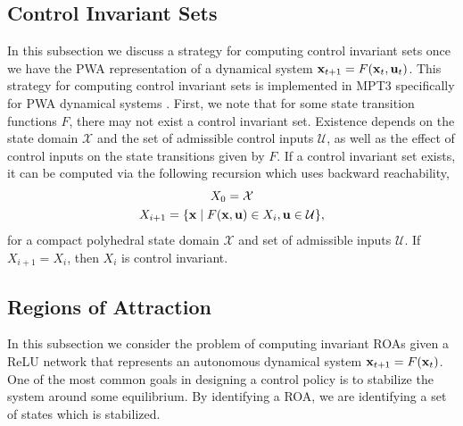 \subsection{Control Invariant Sets}
In this subsection we discuss a strategy for computing control invariant sets once we have the PWA representation of a dynamical system $\mathbf{x}_{t+1} = F(\mathbf{x}_t, \mathbf{u}_t)$.
This strategy for computing control invariant sets is implemented in MPT3 specifically for PWA dynamical systems \cite{MPT3}.
First, we note that for some state transition functions $F$, there may not exist a control invariant set.
Existence depends on the state domain $\mathcal{X}$ and the set of admissible control inputs $\mathcal{U}$, as well as the effect of control inputs on the state transitions given by $F$.
If a control invariant set exists, it can be computed via the following recursion which uses backward reachability,
\begin{subequations}
\begin{gather}
    X_0 = \mathcal{X} \\
    X_{i+1} = \{\mathbf{x} \mid F(\mathbf{x},\mathbf{u}) \in X_{i}, \mathbf{u} \in \mathcal{U} \},
\end{gather}
\end{subequations}
for a compact polyhedral state domain $\mathcal{X}$ and set of admissible inputs $\mathcal{U}$. 
If $X_{i+1} = X_i$, then $X_i$ is control invariant. 




\subsection{Regions of Attraction}
In this subsection we consider the problem of computing invariant ROAs given a ReLU network that represents an autonomous dynamical system $\mathbf{x}_{t+1} = F(\mathbf{x}_t)$. 
One of the most common goals in designing a control policy is to stabilize the system around some equilibrium.
By identifying a ROA, we are identifying a set of states which is stabilized.

